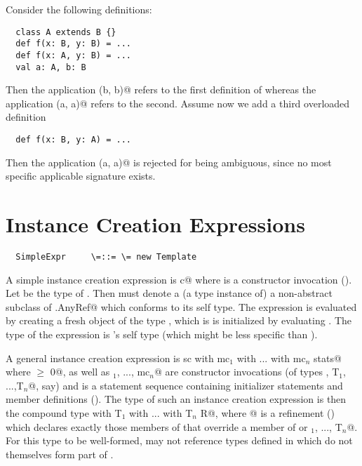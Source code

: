 \documentclass[11pt]{report}
\begin{document}
\example Consider the following definitions:

\begin{verbatim}
  class A extends B {}
  def f(x: B, y: B) = ...
  def f(x: A, y: B) = ...
  val a: A, b: B
\end{verbatim}
Then the application \verb@f(b, b)@ refers to the first
definition of \verb@f@ whereas the application \verb@f(a, a)@
refers to the second.  Assume now we add a third overloaded definition
\begin{verbatim}
  def f(x: B, y: A) = ...
\end{verbatim}
Then the application \verb@f(a, a)@ is rejected for being ambiguous, since
no most specific applicable signature exists.

\section{Instance Creation Expressions}
\label{sec:inst-creation}

\syntax\begin{verbatim}
  SimpleExpr     \=::= \= new Template
\end{verbatim}

A simple instance creation expression is \verb@new c@ where \verb@c@
is a constructor invocation ().  Let \verb@T@
be the type of \verb@c@. Then \verb@T@ must denote a (a type instance
of) a non-abstract subclass of \verb@scala.AnyRef@ which
conforms to its self type. The expression is evaluated by creating a
fresh object of the type \verb@T@, which is is initialized by
evaluating \verb@c@. The type of the expression is \verb@T@'s self
type (which might be less specific than \verb@T@).

A general instance creation expression is
\verb@new sc with mc$_1$ with ... with mc$_n$ {stats}@ where
\verb@n $\geq$ 0@, \verb@sc@ as well as \verb@mc$_1$, ..., mc$_n$@ are
constructor invocations (of types \verb@S, T$_1$, ...,T$_n$@, say) and
\verb@stats@ is a statement sequence containing initializer statements
and member definitions (). The type of such an
instance creation expression is then the compound type
\verb@S with T$_1$ with ... with T$_n$ {R}@, where @ is a
refinement () which declares exactly those
members of \verb@stats@ that override a member of \verb@S@ or
\verb@T$_1$, ..., T$_n$@. For this type to be well-formed, \verb@R@
may not reference types defined in \verb@stats@ which do not
themselves form part of \verb@R@.
\end{document}
